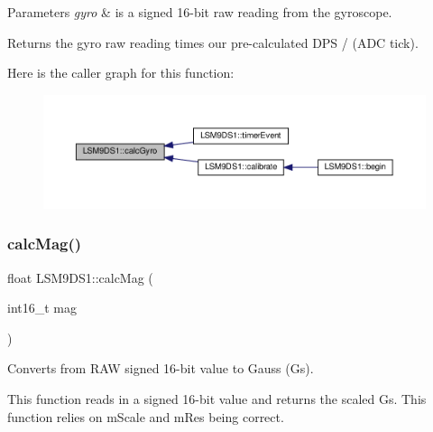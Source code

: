 \begin{DoxyParams}{Parameters}
{\em gyro} & is a signed 16-\/bit raw reading from the gyroscope. \\
\hline
\end{DoxyParams}
\begin{DoxyReturn}{Returns}
the gyro raw reading times our pre-\/calculated D\+PS / (A\+DC tick). 
\end{DoxyReturn}
Here is the caller graph for this function\+:
\nopagebreak
\begin{figure}[H]
\begin{center}
\leavevmode
\includegraphics[width=350pt]{classLSM9DS1_a76707323565bc4170ea8e27a932c95e4_icgraph}
\end{center}
\end{figure}
\mbox{\label{classLSM9DS1_a7d0b0740497b1a10cd3e46a282a143ec}} 
\subsubsection{\texorpdfstring{calc\+Mag()}{calcMag()}}
{\footnotesize\ttfamily float L\+S\+M9\+D\+S1\+::calc\+Mag (\begin{DoxyParamCaption}\item[{int16\+\_\+t}]{mag }\end{DoxyParamCaption})}



Converts from R\+AW signed 16-\/bit value to Gauss (Gs). 

This function reads in a signed 16-\/bit value and returns the scaled Gs. This function relies on m\+Scale and m\+Res being correct.


